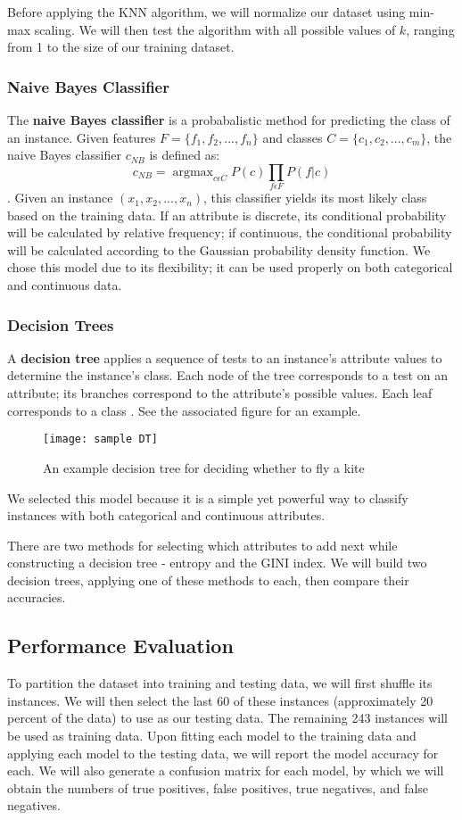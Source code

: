 \documentclass{article}
\DeclareMathOperator*{\argmax}{argmax}
\begin{document}
Before applying the KNN algorithm, we will normalize our dataset using min-max scaling. We will then test the algorithm with all possible values of $k$, ranging from 1 to the size of our training dataset.  
\subsubsection{Naive Bayes Classifier}
The \textbf{naive Bayes classifier} is a probabalistic method for predicting the class of an instance. Given features $F = \{f_1, f_2, ... , f_n\}$ and classes $C=\{c_1, c_2, ... , c_m\}$, the naive Bayes classifier $c_{NB}$ is defined as:
\begin{equation} \label{eq:1}
c_{NB} = \argmax_{c\epsilon C} P(c) \prod_{f\epsilon F} P(f | c)
\end{equation}
\citep{naive}. Given an instance $(x_1, x_2, ... , x_n)$, this classifier yields its most likely class based on the training data. If an attribute is discrete, its conditional probability will be calculated by relative frequency; if continuous, the conditional probability will be calculated according to the Gaussian probability density function. We chose this model due to its flexibility; it can be used properly on both categorical and continuous data.
\subsubsection{Decision Trees}
A \textbf{decision tree} applies a sequence of tests to an instance's attribute values to determine the instance's class. Each node of the tree corresponds to a test on an attribute; its branches correspond to the attribute's possible values. Each leaf corresponds to a class \citep{russel}. See the associated figure for an example.
\begin{figure}[h]
\texttt{[image: sample DT]}
\centering
\caption{An example decision tree for deciding whether to fly a kite}
\centering
\end{figure}
We selected this model because it is a simple yet powerful way to classify instances with both categorical and continuous attributes.


There are two methods for selecting which attributes to add next while constructing a decision tree - entropy and the GINI index. We will build two decision trees, applying one of these methods to each, then compare their accuracies.
\subsection{Performance Evaluation}
To partition the dataset into training and testing data, we will first shuffle its instances. We will then select the last 60 of these instances (approximately 20 percent of the data) to use as our testing data. The remaining 243 instances will be used as training data. Upon fitting each model to the training data and applying each model to the testing data, we will report the model accuracy for each. We will also generate a confusion matrix for each model, by which we will obtain the numbers of true positives, false positives, true negatives, and false negatives.
\end{document}
